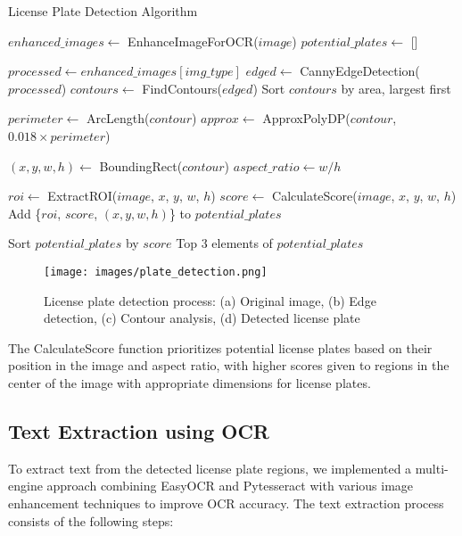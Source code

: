 \documentclass[conference]{IEEEtran}
\begin{document}
\begin{algorithm}[h]
\caption{License Plate Detection Algorithm}
\label{alg:lp_detection}
\scriptsize
\begin{algorithmic}[1]
    \State $enhanced\_images \gets$ EnhanceImageForOCR($image$)
    \State $potential\_plates \gets$ []
    
        \State $processed \gets enhanced\_images[img\_type]$
        \State $edged \gets$ CannyEdgeDetection($processed$)
        \State $contours \gets$ FindContours($edged$)
        \State Sort $contours$ by area, largest first
        
            \State $perimeter \gets$ ArcLength($contour$)
            \State $approx \gets$ ApproxPolyDP($contour$, $0.018 \times perimeter$)
            
                \State $(x, y, w, h) \gets$ BoundingRect($contour$)
                \State $aspect\_ratio \gets w / h$
                
                    \State $roi \gets$ ExtractROI($image$, $x$, $y$, $w$, $h$)
                    \State $score \gets$ CalculateScore($image$, $x$, $y$, $w$, $h$)
                    \State Add \{$roi$, $score$, $(x, y, w, h)$\} to $potential\_plates$
                \EndIf
            \EndIf
        \EndFor
    \EndFor
    
    \State Sort $potential\_plates$ by $score$
    \State \Return Top 3 elements of $potential\_plates$
\EndProcedure
\end{algorithmic}
\end{algorithm}

\begin{figure}[h]
\centering
\texttt{[image: images/plate\_detection.png]}
\caption{License plate detection process: (a) Original image, (b) Edge detection, (c) Contour analysis, (d) Detected license plate}
\label{fig:plate_detection}
\end{figure}

The CalculateScore function prioritizes potential license plates based on their position in the image and aspect ratio, with higher scores given to regions in the center of the image with appropriate dimensions for license plates.

\subsection{Text Extraction using OCR}
To extract text from the detected license plate regions, we implemented a multi-engine approach combining EasyOCR and Pytesseract with various image enhancement techniques to improve OCR accuracy. The text extraction process consists of the following steps:
\end{document}
